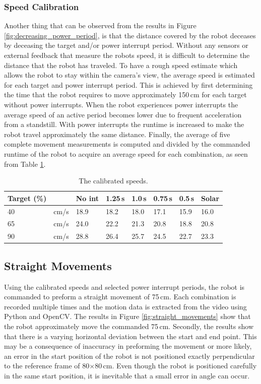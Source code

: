 \subsubsection{Speed Calibration}
Another thing that can be observed from the results in Figure \ref{fig:decreasing_power_period}, is that the distance covered by the robot deceases by deceasing the target and/or power interrupt period.
Without any sensors or external feedback that measure the robots speed, it is difficult to determine the distance that the robot has traveled.
To have a rough speed estimate which allows the robot to stay within the camera's view, the average speed is estimated for each target and power interrupt period.
This is achieved by first determining the time that the robot requires to move approximately 150\,cm for each target without power interrupts.
When the robot experiences power interrupts the average speed of an active period becomes lower due to frequent acceleration from a standstill.
With power interrupts the runtime is increased to make the robot travel approximately the same distance.
Finally, the average of five complete movement measurements is computed and divided by the commanded runtime of the robot to acquire an average speed for each combination, as seen from Table \ref{tab:val_calib}.


\begin{table}[t]
	\centering
	\small
	\caption{The calibrated speeds.}
	\label{tab:val_calib}
	\begin{tabular}{|l|l||l|l|l|l|l|l|}
		\hline
		Target (\%) & & No int & 1.25\,s & 1.0\,s & 0.75\,s & 0.5\,s & Solar \\
		\hline \hline
		 40 & cm/s & 18.9 & 18.2 & 18.0 & 17.1 & 15.9 & 16.0\\
	     65 & cm/s & 24.0 & 22.2 & 21.3 & 20.8 & 18.8 & 20.8\\
		 90 & cm/s & 28.8  & 26.4 & 25.7 & 24.5 & 22.7 & 23.3 \\
		\hline
	\end{tabular}
\end{table}

\subsection{Straight Movements}
\label{eval:straight_movements}

Using the calibrated speeds and selected power interrupt periods, the robot is commanded to preform a straight movement of 75\,cm.
Each combination is recorded multiple times and the motion data is extracted from the video using Python and OpenCV.
The results in Figure \ref{fig:straight_movements} show that the robot approximately move the commanded 75\,cm.
Secondly, the results show that there is a varying horizontal deviation between the start and end point.
This may be a consequence of inaccuracy in preforming the movement or more likely, an error in the start position of the robot is not positioned exactly perpendicular to the reference frame of 80$\times$80\,cm.
Even though the robot is positioned carefully in the same start position, it is inevitable that a small error in angle can occur.

